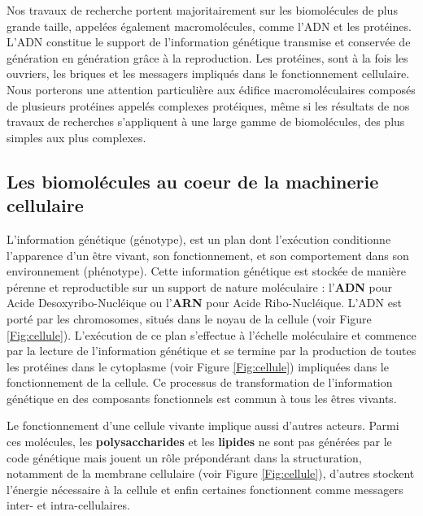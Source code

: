Nos travaux de recherche portent majoritairement sur les biomolécules de plus grande taille, appelées également macromolécules, comme l'ADN et les protéines. L'ADN constitue le support de l'information génétique transmise et conservée de génération en génération grâce à la reproduction. Les protéines, sont à la fois les ouvriers, les briques et les messagers impliqués dans le fonctionnement cellulaire. Nous porterons une attention particulière aux édifice macromoléculaires composés de plusieurs protéines appelés complexes protéiques, même si les résultats de nos travaux de recherches s'appliquent à une large gamme de biomolécules, des plus simples aux plus complexes.

\subsection{Les biomolécules au coeur de la machinerie cellulaire}

L'information génétique (génotype), est un plan dont l'exécution conditionne l'apparence d'un être vivant, son fonctionnement, et son comportement dans son environnement (phénotype). Cette information génétique est stockée de manière pérenne et reproductible sur un support de nature moléculaire : l'\textbf{ADN} pour Acide Desoxyribo-Nucléique ou l'\textbf{ARN} pour Acide Ribo-Nucléique. L'ADN est porté par les chromosomes, situés dans le noyau de la cellule (voir Figure \ref{Fig:cellule}).
L'exécution de ce plan s'effectue à l'échelle moléculaire et commence par la lecture de l'information génétique et se termine par la production de toutes les protéines dans le cytoplasme (voir Figure \ref{Fig:cellule}) impliquées dans le fonctionnement de la cellule. Ce processus de transformation de l'information génétique en des composants fonctionnels est commun à tous les êtres vivants.

Le fonctionnement d'une cellule vivante implique aussi d'autres acteurs. Parmi ces molécules, les \textbf{polysaccharides} et les \textbf{lipides} ne sont pas générées par le code génétique mais jouent un rôle prépondérant dans la structuration, notamment de la membrane cellulaire (voir Figure \ref{Fig:cellule}), d'autres stockent l'énergie nécessaire à la cellule et enfin certaines fonctionnent comme messagers inter- et intra-cellulaires.



